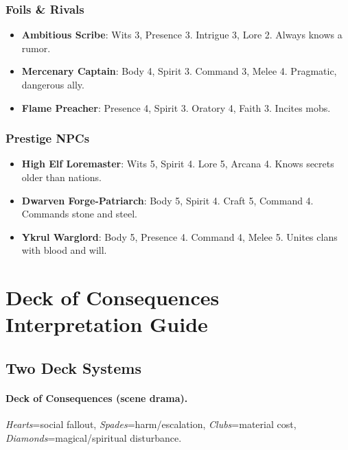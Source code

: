 \subsubsection*{Foils \& Rivals}

\begin{itemize}
    \item \textbf{Ambitious Scribe}: Wits 3, Presence 3. Intrigue 3, Lore 2. Always knows a rumor.
    \item \textbf{Mercenary Captain}: Body 4, Spirit 3. Command 3, Melee 4. Pragmatic, dangerous ally.
    \item \textbf{Flame Preacher}: Presence 4, Spirit 3. Oratory 4, Faith 3. Incites mobs.
\end{itemize}

\subsubsection*{Prestige NPCs}

\begin{itemize}
    \item \textbf{High Elf Loremaster}: Wits 5, Spirit 4. Lore 5, Arcana 4. Knows secrets older than nations.
    \item \textbf{Dwarven Forge-Patriarch}: Body 5, Spirit 4. Craft 5, Command 4. Commands stone and steel.
    \item \textbf{Ykrul Warglord}: Body 5, Presence 4. Command 4, Melee 5. Unites clans with blood and will.
\end{itemize}

\section*{Deck of Consequences Interpretation Guide}

\subsection*{Two Deck Systems}

\paragraph{Deck of Consequences (scene drama).}
\emph{Hearts}=social fallout, \emph{Spades}=harm/escalation, \emph{Clubs}=material cost, \emph{Diamonds}=magical/spiritual disturbance.

